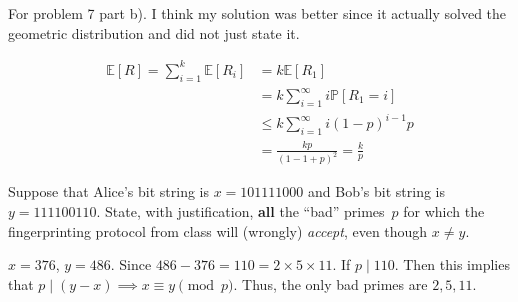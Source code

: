 \documentclass[12pt, letterpaper]{article}
\renewcommand{\P}{\mathbb{P}}
\begin{document}
\color{\TextColor}
\pagecolor{\colormode}
\setlength{\parindent}{0pt}
\pagestyle{fancy}
\fancyhf{}
\fancyhead[ROE]{\color{\TextColor}\thepage}
\newcommand{\E}{\mathbb{E}}
\begin{solution}
    For problem 7 part b). I think my solution was better since it actually solved the geometric distribution and did not just state it.

    \begin{align*}
        \E[R]=\sum_{i=1}^k \E[R_i]&=k\E[R_1]\\
        &=k\sum_{i=1}^\infty i \P[R_1=i]\\
        &\leq k\sum_{i=1}^\infty i(1-p)^{i-1}p\\
        &= \frac{kp}{(1-1+p)^2}=\frac{k}{p}
    \end{align*}
\end{solution}

\begin{subproblem}{}
    Suppose that Alice's bit string is $x=101111000$ and Bob's bit string is $y=111100110$.
    State, with justification, \textbf{all} the ``bad'' primes~$p$ for which the fingerprinting protocol from class will (wrongly) \emph{accept}, even though $x \neq y$.
\end{subproblem}
\begin{problemproof}
    $x=376$, $y=486$. Since $486-376=110=2 \times 5 \times 11$. If $p \mid 110$. Then this implies that $p \mid (y-x) \implies x \equiv y \pmod{p}$. Thus, the only bad primes are $2,5,11$.
\end{problemproof}
\end{document}
